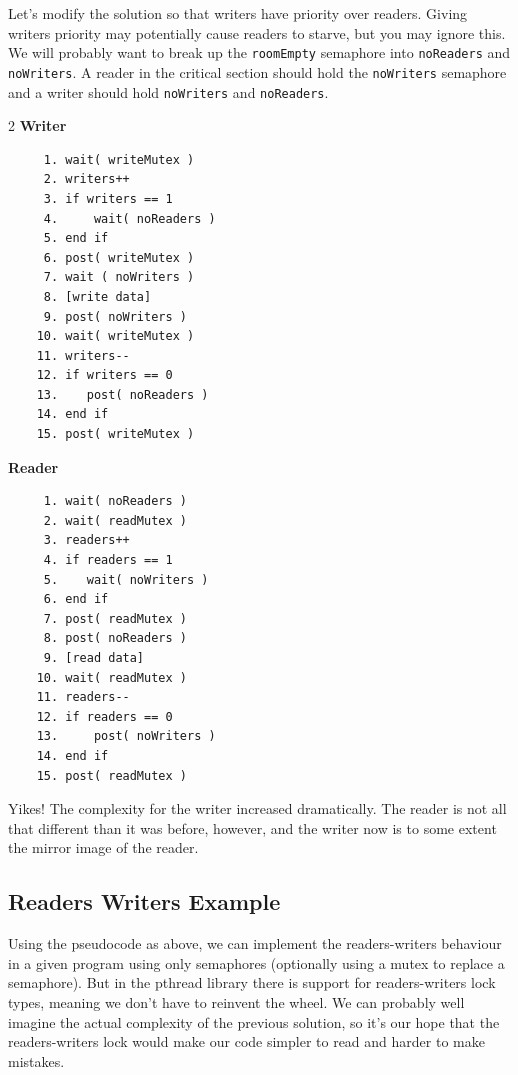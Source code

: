 Let's modify the solution so that writers have priority over readers. Giving writers priority may potentially cause readers to starve, but you may ignore this. We will probably want to break up the \texttt{roomEmpty} semaphore into \texttt{noReaders} and \texttt{noWriters}. A reader in the critical section should hold the \texttt{noWriters} semaphore and a writer should hold \texttt{noWriters} and \texttt{noReaders}.

\begin{multicols}{2}
	\textbf{Writer}\vspace{-1em}
	\begin{verbatim}
     1. wait( writeMutex )
     2. writers++
     3. if writers == 1
     4.     wait( noReaders )
     5. end if
     6. post( writeMutex )
     7. wait ( noWriters )
     8. [write data]
     9. post( noWriters ) 
    10. wait( writeMutex )
    11. writers--
    12. if writers == 0
    13.    post( noReaders )
    14. end if
    15. post( writeMutex )     
  \end{verbatim}
	\columnbreak
	\textbf{Reader}\vspace{-2em}
	\begin{verbatim}
     1. wait( noReaders )
     2. wait( readMutex )
     3. readers++
     4. if readers == 1
     5.    wait( noWriters )
     6. end if
     7. post( readMutex )
     8. post( noReaders )
     9. [read data]
    10. wait( readMutex )
    11. readers--
    12. if readers == 0
    13.     post( noWriters )
    14. end if
    15. post( readMutex )
\end{verbatim}
\end{multicols}
\vspace{-2em}

Yikes! The complexity for the writer increased dramatically. The reader is not all that different than it was before, however, and the writer now is to some extent the mirror image of the reader.

\subsection*{Readers Writers Example}
Using the pseudocode as above, we can implement the readers-writers behaviour in a given program using only semaphores (optionally using a mutex to replace a semaphore). But in the pthread library there is support for readers-writers lock types, meaning we don't have to reinvent the wheel. We can probably well imagine the actual complexity of the previous solution, so it's our hope that the readers-writers lock would make our code simpler to read and harder to make mistakes.

